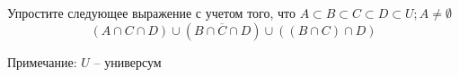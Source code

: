 \question
Упростите следующее выражение с учетом того, что $A\subset B \subset C \subset D \subset U; A \neq \emptyset$
\begin{equation*}
	(A \cap C  \cap D) \cup (B \cap \overline{C} \cap D) \cup ((B \cap C) \cap D)
\end{equation*}

Примечание: $U$ -- универсум